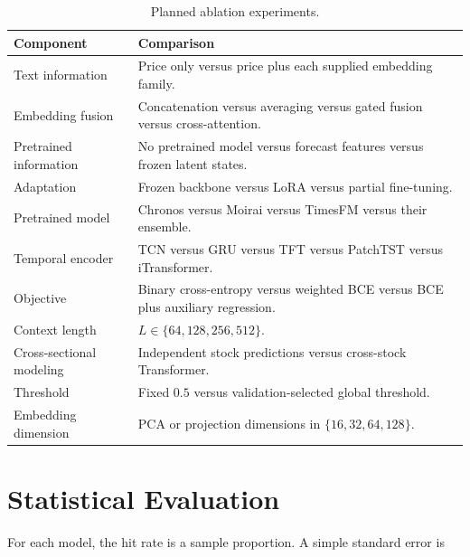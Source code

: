 \documentclass[11pt]{article}
\begin{document}
\begin{table}[ht]
\centering
\caption{Planned ablation experiments.}
\begin{tabular}{p{}p{}}
\toprule
\textbf{Component} & \textbf{Comparison} \\
\midrule
Text information
&
Price only versus price plus each supplied embedding family.
\\

Embedding fusion
&
Concatenation versus averaging versus gated fusion versus cross-attention.
\\

Pretrained information
&
No pretrained model versus forecast features versus frozen latent states.
\\

Adaptation
&
Frozen backbone versus LoRA versus partial fine-tuning.
\\

Pretrained model
&
Chronos versus Moirai versus TimesFM versus their ensemble.
\\

Temporal encoder
&
TCN versus GRU versus TFT versus PatchTST versus iTransformer.
\\

Objective
&
Binary cross-entropy versus weighted BCE versus BCE plus auxiliary regression.
\\

Context length
&
$L\in\{64,128,256,512\}$.
\\

Cross-sectional modeling
&
Independent stock predictions versus cross-stock Transformer.
\\

Threshold
&
Fixed $0.5$ versus validation-selected global threshold.
\\

Embedding dimension
&
PCA or projection dimensions in $\{16,32,64,128\}$.
\\
\bottomrule
\end{tabular}
\end{table}

\section{Statistical Evaluation}

For each model, the hit rate is a sample proportion. A simple standard error is
\end{document}
